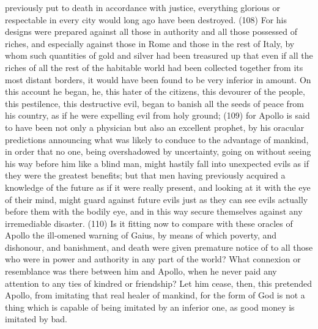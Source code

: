 previously put to death in accordance with justice, everything glorious or respectable in every city
would long ago have been destroyed. (108) For his designs were prepared against all those in
authority and all those possessed of riches, and especially against those in Rome and those in the
rest of Italy, by whom such quantities of gold and silver had been treasured up that even if all the
riches of all the rest of the habitable world had been collected together from its most distant
borders, it would have been found to be very inferior in amount. On this account he began, he, this
hater of the citizens, this devourer of the people, this pestilence, this destructive evil, began to
banish all the seeds of peace from his country, as if he were expelling evil from holy ground; (109)
for Apollo is said to have been not only a physician but also an excellent prophet, by his oracular
predictions announcing what was likely to conduce to the advantage of mankind, in order that no
one, being overshadowed by uncertainty, going on without seeing his way before him like a blind
man, might hastily fall into unexpected evils as if they were the greatest benefits; but that men
having previously acquired a knowledge of the future as if it were really present, and looking at it
with the eye of their mind, might guard against future evils just as they can see evils actually before
them with the bodily eye, and in this way secure themselves against any irremediable disaster.
(110) Is it fitting now to compare with these oracles of Apollo the ill-omened warning of Gaius, by
means of which poverty, and dishonour, and banishment, and death were given premature notice
of to all those who were in power and authority in any part of the world? What connexion or
resemblance was there between him and Apollo, when he never paid any attention to any ties of
kindred or friendship? Let him cease, then, this pretended Apollo, from imitating that real healer of
mankind, for the form of God is not a thing which is capable of being imitated by an inferior one, as
good money is imitated by bad.

